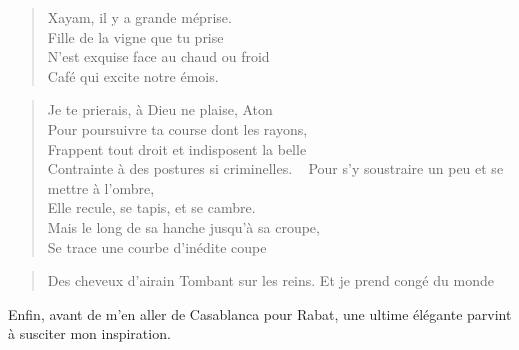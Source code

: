 \begin{verse}
Xayam\label{foot.xayam}, il y a grande méprise.\\
Fille de la vigne que tu prise\\
N’est exquise face au chaud ou froid\\
Café qui excite notre émois.
\end{verse}

\begin{verse}
Je te prierais, à Dieu ne plaise, Aton\\
Pour poursuivre ta course dont les rayons,\\
Frappent tout droit et indisposent la belle\\
Contrainte à des postures si criminelles.
~
Pour s’y soustraire un peu et se mettre à l’ombre,\\
Elle recule, se tapis, et se cambre.\\
Mais le long de sa hanche jusqu’à sa croupe,\\
Se trace une courbe d’inédite coupe
\end{verse}

\begin{verse}
Des cheveux d’airain
Tombant sur les reins.
Et je prend congé du monde
\end{verse}

\begin{prose}
Enfin, avant de m’en aller de Casablanca pour Rabat, une ultime élégante parvint à susciter mon inspiration.
\end{prose}

